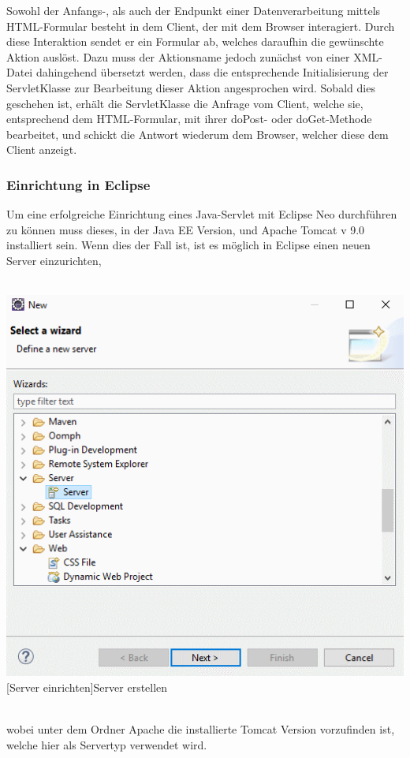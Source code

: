 \documentclass[12pt,a4paper,bibliography=totocnumbered,listof=totocnumbered]{scrartcl}
\begin{document}
Sowohl der Anfangs-, als auch der Endpunkt einer Datenverarbeitung mittels HTML-Formular besteht in dem Client, der mit dem Browser interagiert. Durch diese Interaktion sendet er ein Formular ab, welches daraufhin die gewünschte Aktion auslöst. Dazu muss der Aktionsname jedoch zunächst von einer XML-Datei dahingehend übersetzt werden, dass die entsprechende Initialisierung der ServletKlasse zur Bearbeitung dieser Aktion angesprochen wird.
Sobald dies geschehen ist, erhält die ServletKlasse die Anfrage vom Client, welche sie, entsprechend dem HTML-Formular, mit ihrer doPost- oder doGet-Methode bearbeitet, und schickt die Antwort wiederum dem Browser, welcher diese dem Client anzeigt.

\subsubsection{Einrichtung in Eclipse}
Um eine erfolgreiche Einrichtung eines Java-Servlet mit Eclipse Neo durchführen zu können muss dieses, in der Java EE Version, und Apache Tomcat v 9.0 installiert sein. 
Wenn dies der Fall ist, ist es möglich in Eclipse einen neuen Server einzurichten, \\
\\
\vspace{1em}
\begin{minipage}{\linewidth}
	\centering
	\includegraphics[width=0.7\linewidth]{Bilder/Eclipse-ServerErstellen.png}
    [Server einrichten]{Server erstellen}	
	\label{fig:eclipse1}
\end{minipage}
\\
wobei unter dem Ordner Apache die installierte Tomcat Version vorzufinden ist, welche hier  als Servertyp verwendet wird.\\
\end{document}
